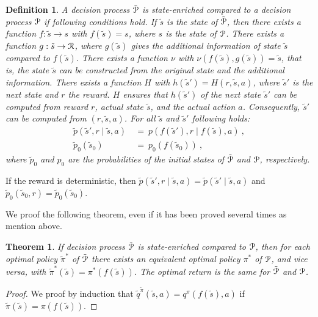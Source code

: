 \documentclass{article}
\newtheorem{theoremA}{Theorem}
\newtheorem{definitionA}{Definition}
\begin{document}
\begin{appendices}
\begin{definitionA}
  A decision process $\tilde{\mathcal{P}}$ is {\em state-enriched} compared to
  a decision process $\mathcal{P}$ if following conditions hold.
  If $\tilde{s}$ is the state of $\tilde{\mathcal{P}}$,
  then there exists a function $f: \tilde{s} \to s $ with $f(\tilde{s})=s$,
  where  $s$ is the state of $\mathcal{P}$.
  There exists a function $g: \tilde{s} \to \mathcal{R}$, where $g(\tilde{s})$
  gives the additional information of state $\tilde{s}$ compared to $f(\tilde{s})$.
  There exists a function $\nu$ with
  $\nu(f(\tilde{s}),g(\tilde{s}))=\tilde{s}$, that is, the state $\tilde{s}$ can be
  constructed from the original state and the additional information.
  There exists a function $H$ with $h(\tilde{s}')=H(r,\tilde{s},a)$, where $\tilde{s}'$
  is the next state and $r$ the reward.
  $H$ ensures that  $h(\tilde{s}')$ of the next state $\tilde{s}'$
  can be computed from
  reward $r$, actual state $\tilde{s}$, and the actual action
  $a$. Consequently, $\tilde{s}'$ can be computed from $(r,\tilde{s},a)$.
  For all $\tilde{s}$ and $\tilde{s}'$ following holds: 
 \begin{align}
   \tilde{p}(\tilde{s}',r\mid \tilde{s},a) \ &= \ p(f(\tilde{s}') ,r
   \mid f(\tilde{s}),a)  \ , \\ 
   \tilde{p}_0(\tilde{s}_0) \ &= \  p_0(f(\tilde{s}_0)) \ ,
 \end{align}
 where $\tilde{p}_0$ and $p_0$ are the probabilities of the initial states
 of $\tilde{\mathcal{P}}$ and $\mathcal{P}$, respectively.
\end{definitionA}
If the reward is deterministic, then
$\tilde{p}(\tilde{s}',r\mid \tilde{s},a)=
\tilde{p}(\tilde{s}'\mid \tilde{s},a)$ and
$\tilde{p}_0(\tilde{s}_0,r)=\tilde{p}_0(\tilde{s}_0)$.




We proof the following theorem, even if it has been proved several
times as mention above.
\begin{theoremA}
  If decision process $\tilde{\mathcal{P}}$ is state-enriched compared to
  $\mathcal{P}$, then for each optimal policy $\tilde{\pi}^*$ of $\tilde{\mathcal{P}}$ there
  exists an equivalent optimal policy $\pi^*$ of $\mathcal{P}$, and vice
  versa, with $\tilde{\pi}^*(\tilde{s})=\pi^*(f(\tilde{s}))$. The
  optimal return is the same for $\tilde{\mathcal{P}}$ and $\mathcal{P}$.
\end{theoremA}




\begin{proof}
  We proof by induction that
  $\tilde{q}^{\tilde{\pi}}(\tilde{s},a)=q^{\pi}(f(\tilde{s}),a)$ if
  $\tilde{\pi}(\tilde{s})=\pi(f(\tilde{s}))$.


\end{proof}
\end{appendices}
\end{document}
